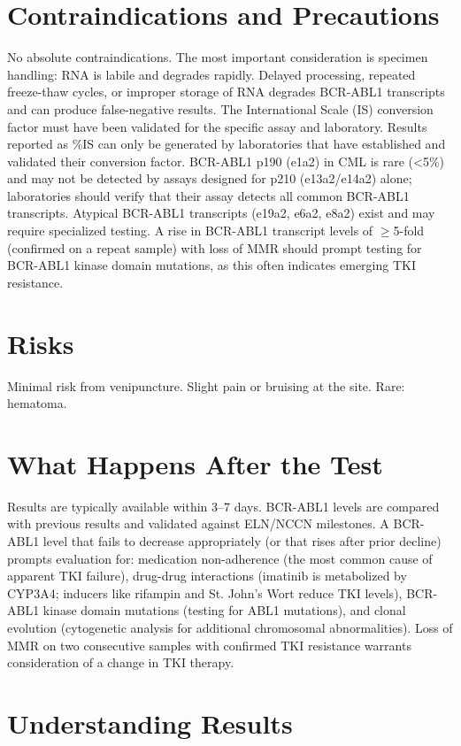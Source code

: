 \section*{Contraindications and Precautions}
No absolute contraindications. The most important consideration is specimen handling: RNA is labile and degrades rapidly. Delayed processing, repeated freeze-thaw cycles, or improper storage of RNA degrades BCR-ABL1 transcripts and can produce false-negative results. The International Scale (IS) conversion factor must have been validated for the specific assay and laboratory. Results reported as \%IS can only be generated by laboratories that have established and validated their conversion factor. BCR-ABL1 p190 (e1a2) in CML is rare (<5\%) and may not be detected by assays designed for p210 (e13a2/e14a2) alone; laboratories should verify that their assay detects all common BCR-ABL1 transcripts. Atypical BCR-ABL1 transcripts (e19a2, e6a2, e8a2) exist and may require specialized testing. A rise in BCR-ABL1 transcript levels of $\geq$5-fold (confirmed on a repeat sample) with loss of MMR should prompt testing for BCR-ABL1 kinase domain mutations, as this often indicates emerging TKI resistance.

\section*{Risks}
Minimal risk from venipuncture. Slight pain or bruising at the site. Rare: hematoma.

\section*{What Happens After the Test}
Results are typically available within 3--7 days. BCR-ABL1 levels are compared with previous results and validated against ELN/NCCN milestones. A BCR-ABL1 level that fails to decrease appropriately (or that rises after prior decline) prompts evaluation for: medication non-adherence (the most common cause of apparent TKI failure), drug-drug interactions (imatinib is metabolized by CYP3A4; inducers like rifampin and St. John's Wort reduce TKI levels), BCR-ABL1 kinase domain mutations (testing for ABL1 mutations), and clonal evolution (cytogenetic analysis for additional chromosomal abnormalities). Loss of MMR on two consecutive samples with confirmed TKI resistance warrants consideration of a change in TKI therapy.

\section*{Understanding Results}

